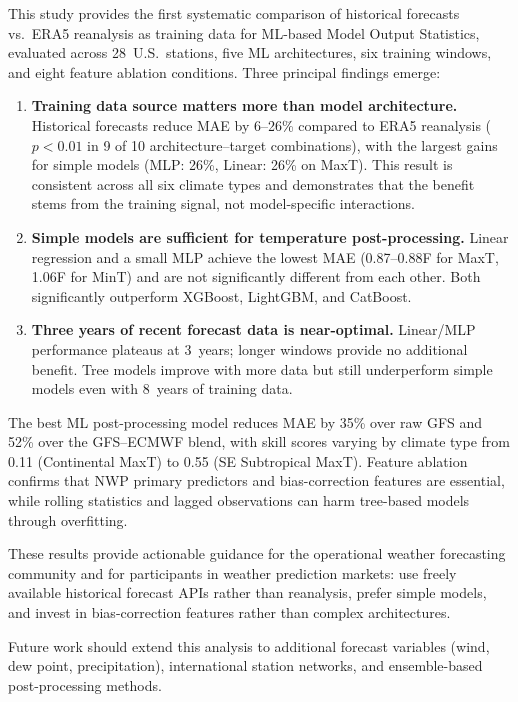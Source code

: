 \documentclass[12pt, letterpaper]{article}
\begin{document}
This study provides the first systematic comparison of historical forecasts vs.\
ERA5 reanalysis as training data for ML-based Model Output Statistics, evaluated
across 28~U.S.\ stations, five ML architectures, six training windows, and
eight feature ablation conditions. Three principal findings emerge:

\begin{enumerate}
  \item \textbf{Training data source matters more than model architecture.}
    Historical forecasts reduce MAE by 6--26\% compared to ERA5 reanalysis
    ($p < 0.01$ in 9 of 10 architecture--target combinations), with the
    largest gains for simple models (MLP: 26\%, Linear: 26\% on MaxT). This
    result is consistent across all six climate types and demonstrates that the
    benefit stems from the training signal, not model-specific interactions.
  \item \textbf{Simple models are sufficient for temperature post-processing.}
    Linear regression and a small MLP achieve the lowest MAE (0.87--0.88\textdegree{}F
    for MaxT, 1.06\textdegree{}F for MinT) and are not significantly different from
    each other. Both significantly outperform XGBoost, LightGBM, and CatBoost.
  \item \textbf{Three years of recent forecast data is near-optimal.}
    Linear/MLP performance plateaus at 3~years; longer windows provide no
    additional benefit. Tree models improve with more data but still underperform
    simple models even with 8~years of training data.
\end{enumerate}

The best ML post-processing model reduces MAE by 35\% over raw GFS and 52\% over
the GFS--ECMWF blend, with skill scores varying by climate type from 0.11
(Continental MaxT) to 0.55 (SE Subtropical MaxT). Feature ablation confirms that
NWP primary predictors and bias-correction features are essential, while rolling
statistics and lagged observations can harm tree-based models through overfitting.

These results provide actionable guidance for the operational weather forecasting
community and for participants in weather prediction markets: use freely available
historical forecast APIs rather than reanalysis, prefer simple models, and invest
in bias-correction features rather than complex architectures.

Future work should extend this analysis to additional forecast variables (wind,
dew point, precipitation), international station networks, and ensemble-based
post-processing methods.
\end{document}
